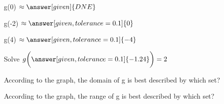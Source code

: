 \documentclass{ximera}
\begin{document}
\begin{exercise}
g(0)   $\approx \answer[given]{DNE}$
\end{exercise}


\begin{exercise}
g(-2)   $\approx \answer[given,tolerance=0.1]{0}$
\end{exercise}


\begin{exercise}
g(4)   $\approx \answer[given,tolerance=0.1]{-4}$
\end{exercise}



\begin{exercise}
Solve   $ g\bigg( \answer[given,tolerance=0.1]{-1.24} \bigg) = 2$
\end{exercise}







\begin{exercise}
According to the graph, the domain of g is best described by which set?
\begin{multipleChoice}
\choice{$[-4, \infty)$}
\choice{$[4, -1) \cup [1.5, 3)$}
\choice[correct]{$[4, -1) \cup [1.5, \infty)$}
\end{multipleChoice}
\end{exercise}

\begin{exercise}
According to the graph, the range of g is best described by which set?
\begin{multipleChoice}
\choice{$[-1.4, 2.8) \cup [1, -2))$}
\choice{$[1.5, \infty)$}
\end{multipleChoice}
\end{exercise}
\end{document}
